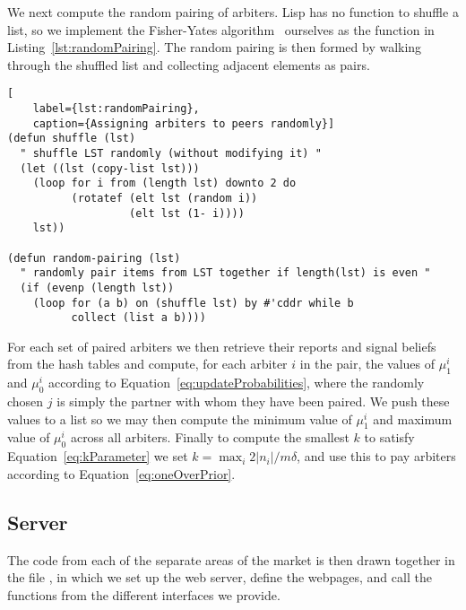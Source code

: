 We next compute the random pairing of arbiters. Lisp has no function to shuffle
a list, so we implement the Fisher-Yates
algorithm~\cite[pg.~26-27]{FisherYates1938} ourselves as the 
function in Listing~\ref{lst:randomPairing}. The random pairing is then formed
by walking through the shuffled list and collecting adjacent elements as pairs.

\begin{lstlisting}[
	label={lst:randomPairing},
	caption={Assigning arbiters to peers randomly}]
(defun shuffle (lst)
  " shuffle LST randomly (without modifying it) "
  (let ((lst (copy-list lst)))
    (loop for i from (length lst) downto 2 do
          (rotatef (elt lst (random i))
                   (elt lst (1- i))))
    lst))

(defun random-pairing (lst)
  " randomly pair items from LST together if length(lst) is even "
  (if (evenp (length lst))
    (loop for (a b) on (shuffle lst) by #'cddr while b
          collect (list a b))))
\end{lstlisting}

For each set of paired arbiters we then retrieve their reports and signal
beliefs from the hash tables and compute, for each arbiter $i$ in the pair, the
values of $\mu_1^i$ and $\mu_0^i$ according to
Equation~\ref{eq:updateProbabilities}, where the randomly chosen $j$ is simply
the partner with whom they have been paired. We push these values to a list so
we may then compute the minimum value of $\mu_1^i$ and maximum value of
$\mu_0^i$ across all arbiters. Finally to compute the smallest $k$ to satisfy
Equation~\ref{eq:kParameter} we set $k = \max_i 2|n_i|/m\delta$, and use this
to pay arbiters according to Equation~\ref{eq:oneOverPrior}.

\subsection{Server}

\label{sec:server}

The code from each of the separate areas of the market is then drawn together
in the file , in which we set up the web server, define the
webpages, and call the functions from the different interfaces we provide.

